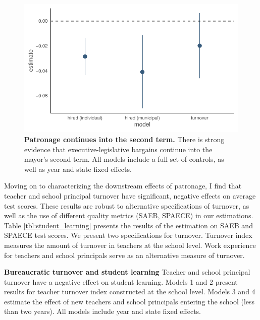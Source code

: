 \documentclass[12pt,a4paper]{article}
\begin{document}
\begin{figure}[h]
    \centering
    \includegraphics{plots/plot_coalition_coef_mun_second.pdf}
    \caption{\textbf{Patronage continues into the second term.} There is strong evidence that executive-legislative bargains continue into the mayor's second term. All models include a full set of controls, as well as year and state fixed effects.}
\end{figure}

Moving on to characterizing the downstream effects of patronage, I find that teacher and school principal turnover have significant, negative effects on average test scores. These results are robust to alternative specifications of turnover, as well as the use of different quality metrics (SAEB, SPAECE) in our estimations. Table \ref{tbl:student_learning} presents the results of the estimation on SAEB and SPAECE test scores. We present two specifications for turnover. Turnover index measures the amount of turnover in teachers at the school level. Work experience for teachers and school principals serve as an alternative measure of turnover.

\begin{landscape}
    \begin{table}[t]
      \centering
      \footnotesize
      
      \caption{{\bf Bureaucratic turnover and student learning} Teacher and school principal turnover have a negative effect on student learning. Models 1 and 2 present results for teacher turnover index constructed at the school level. Models 3 and 4 estimate the effect of new teachers and school principals entering the school (less than two years). All models include year and state fixed effects.}
      \label{tbl:student_learning}
    \end{table}
\end{landscape}
\end{document}
